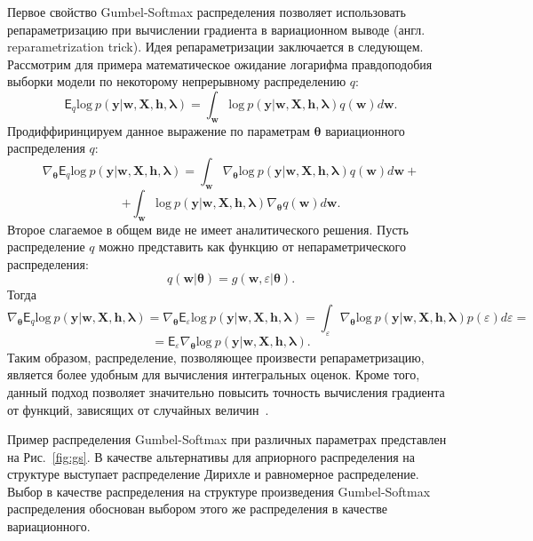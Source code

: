 Первое свойство Gumbel-Softmax распределения позволяет использовать репараметризацию при вычислении градиента в вариационном выводе (англ. reparametrization trick). 
Идея репараметризации заключается в следующем. Рассмотрим для примера математическое ожидание логарифма правдоподобия выборки модели по некоторому непрерывному распределению $q$:
\[
    \mathsf{E}_q \text{log}~p(\mathbf{y}|\mathbf{w}, \mathbf{X}, \mathbf{h}, \boldsymbol{\lambda})=  \int_{\mathbf{w}} \text{log}~p(\mathbf{y}|\mathbf{w}, \mathbf{X}, \mathbf{h}, \boldsymbol{\lambda})q(\mathbf{w})d\mathbf{w}.
\]
Продиффиринцируем данное выражение по параметрам $\boldsymbol{\theta}$ вариационного распределения $q$:
\[
    \nabla_{\boldsymbol{\theta}} \mathsf{E}_q \text{log}~p(\mathbf{y}|\mathbf{w}, \mathbf{X}, \mathbf{h}, \boldsymbol{\lambda}) = \int_{\mathbf{w}}  \nabla_{\boldsymbol{\theta}}\text{log}~p(\mathbf{y}|\mathbf{w}, \mathbf{X}, \mathbf{h}, \boldsymbol{\lambda})q(\mathbf{w})d\mathbf{w} + 
\]
\[
+\int_{\mathbf{w}}  \text{log}~p(\mathbf{y}|\mathbf{w}, \mathbf{X}, \mathbf{h}, \boldsymbol{\lambda})\nabla_{\boldsymbol{\theta}}q(\mathbf{w})d\mathbf{w}.
\]
Второе слагаемое в общем виде не имеет аналитического решения. Пусть распределение $q$ можно представить как функцию от непараметрического распределения:
\[
    q(\mathbf{w}|\boldsymbol{\theta}) = g(\mathbf{w}, \varepsilon|\boldsymbol{\theta}).
\]
Тогда 
\[
 \nabla_{\boldsymbol{\theta}} \mathsf{E}_q \text{log}~p(\mathbf{y}|\mathbf{w}, \mathbf{X}, \mathbf{h}, \boldsymbol{\lambda}) = \nabla_{\boldsymbol{\theta}} \mathsf{E}_{\varepsilon} \text{log}~p(\mathbf{y}|\mathbf{w}, \mathbf{X}, \mathbf{h}, \boldsymbol{\lambda}) = \int_{\varepsilon}  \nabla_{\boldsymbol{\theta}} \text{log}~p(\mathbf{y}|\mathbf{w}, \mathbf{X}, \mathbf{h}, \boldsymbol{\lambda})  p(\varepsilon) d\varepsilon =
\]
\[
    = \mathsf{E}_\varepsilon \nabla_{\boldsymbol{\theta}} \text{log}~p(\mathbf{y}|\mathbf{w}, \mathbf{X}, \mathbf{h}, \boldsymbol{\lambda}).
\]
Таким образом, распределение, позволяющее произвести репараметризацию, является более удобным для вычисления интегральных оценок.
Кроме того, данный подход позволяет значительно повысить точность вычисления градиента от функций, зависящих от случайных величин~\cite{reparametrization}.

Пример распределения Gumbel-Softmax при различных параметрах представлен на Рис.~\ref{fig:gs}. В качестве альтернативы для априорного распределения на структуре выступает  распределение Дирихле и равномерное распределение. Выбор в качестве распределения на структуре произведения Gumbel-Softmax распределения обоснован выбором этого же распределения в качестве вариационного. 


